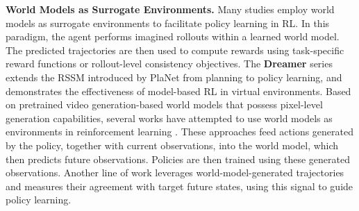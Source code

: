 \textbf{World Models as Surrogate Environments.} 
Many studies employ world models as surrogate environments to facilitate policy learning in RL. In this paradigm, the agent performs imagined rollouts within a learned world model. The predicted trajectories are then used to compute rewards using task-specific reward functions or rollout-level consistency objectives. 
The \textbf{Dreamer} series \cite{Dreamer2, Dreamer3, Dreamer4, DreamerV3, DayDreamer} extends the RSSM introduced by PlaNet \cite{PlaNet} from planning to policy learning, and demonstrates the effectiveness of model-based RL in virtual environments. 
Based on pretrained video generation-based world models that possess pixel-level generation capabilities, several works have attempted to use world models as environments in reinforcement learning \cite{World-Env, world-vla-loop, WMPO, RISE, WoVR, MoDem-V2, World-Gymnast, Uncertainty-Aware, World4RL, DiWA}.
These approaches feed actions generated by the policy, together with current observations, into the world model, which then predicts future observations. Policies are then trained using these generated observations. 
Another line of work \cite{RWML, VLA-RFT, Robot_Learning_from_a_Physical_World_Model} leverages world-model-generated trajectories and measures their agreement with target future states, using this signal to guide policy learning. 


